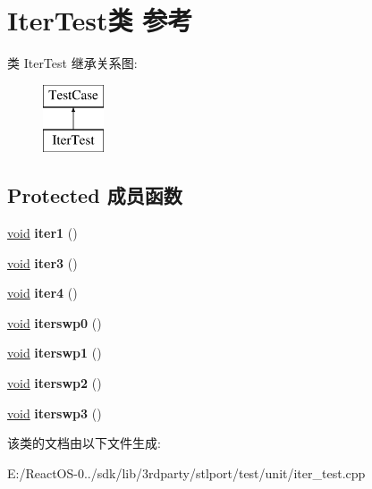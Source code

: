 \hypertarget{class_iter_test}{}\section{Iter\+Test类 参考}
\label{class_iter_test}
类 Iter\+Test 继承关系图\+:\begin{figure}[H]
\begin{center}
\leavevmode
\includegraphics[height=2.000000cm]{class_iter_test}
\end{center}
\end{figure}
\subsection*{Protected 成员函数}
\begin{DoxyCompactItemize}
\item 
\mbox{\label{class_iter_test_a9a51a39b77cbfa0582e65a7daa2af7dc}} 
\hyperlink{interfacevoid}{void} {\bfseries iter1} ()
\item 
\mbox{\label{class_iter_test_a0babcd1123d7e7c7c5544562d4fba65c}} 
\hyperlink{interfacevoid}{void} {\bfseries iter3} ()
\item 
\mbox{\label{class_iter_test_a5a36d50e4f1ca958ef1f5f7efa2a162c}} 
\hyperlink{interfacevoid}{void} {\bfseries iter4} ()
\item 
\mbox{\label{class_iter_test_a21ae9a237ea51ca1fe79288805590155}} 
\hyperlink{interfacevoid}{void} {\bfseries iterswp0} ()
\item 
\mbox{\label{class_iter_test_ac638832fb917bdf147cd9370fac0ee01}} 
\hyperlink{interfacevoid}{void} {\bfseries iterswp1} ()
\item 
\mbox{\label{class_iter_test_a3bf1ce8656b9143c501c7e3766099ce5}} 
\hyperlink{interfacevoid}{void} {\bfseries iterswp2} ()
\item 
\mbox{\label{class_iter_test_a29c9cfceeeec11d81d31f924f12bef73}} 
\hyperlink{interfacevoid}{void} {\bfseries iterswp3} ()
\end{DoxyCompactItemize}


该类的文档由以下文件生成\+:\begin{DoxyCompactItemize}
\item 
E\+:/\+React\+O\+S-\/0../sdk/lib/3rdparty/stlport/test/unit/iter\+\_\+test.\+cpp\end{DoxyCompactItemize}

